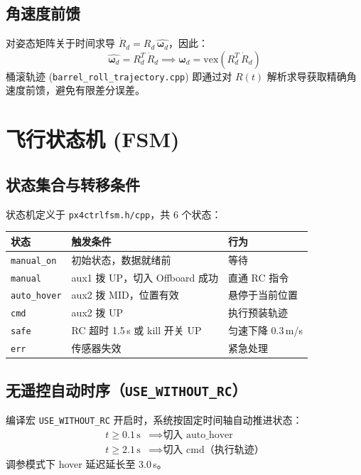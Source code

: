 \documentclass[UTF8, a4paper, 11pt]{ctexart}
\newcommand{\bw}{\boldsymbol{\omega}}
\newcommand{\hhat}[1]{\widehat{#1}}
\begin{document}
\subsection{角速度前馈}

对姿态矩阵关于时间求导 $\dot{R}_d = R_d\,\hhat{\bw_d}$，因此：
\begin{equation}
  \hhat{\bw_d} = R_d^T\,\dot{R}_d \implies \bw_d = \mathrm{vex}\!\left(R_d^T\,\dot{R}_d\right)
\end{equation}
桶滚轨迹 (\texttt{barrel\_roll\_trajectory.cpp}) 即通过对 $R(t)$ 解析求导获取精确角速度前馈，避免有限差分误差。

\section{飞行状态机 (FSM)}

\subsection{状态集合与转移条件}

状态机定义于 \texttt{px4ctrlfsm.h/cpp}，共 6 个状态：

\begin{center}
\begin{tabular}{lll}
\toprule
状态 & 触发条件 & 行为 \\
\midrule
\texttt{manual\_on} & 初始状态，数据就绪前 & 等待 \\
\texttt{manual}     & aux1 拨 UP，切入 Offboard 成功 & 直通 RC 指令 \\
\texttt{auto\_hover}& aux2 拨 MID，位置有效 & 悬停于当前位置 \\
\texttt{cmd}        & aux2 拨 UP & 执行预装轨迹 \\
\texttt{safe}       & RC 超时 1.5\,s 或 kill 开关 UP & 匀速下降 0.3\,m/s \\
\texttt{err}        & 传感器失效 & 紧急处理 \\
\bottomrule
\end{tabular}
\end{center}

\subsection{无遥控自动时序（\texttt{USE\_WITHOUT\_RC}）}

编译宏 \texttt{USE\_WITHOUT\_RC} 开启时，系统按固定时间轴自动推进状态：
\begin{align*}
  t \geq 0.1\,\text{s} &\implies \text{切入 auto\_hover}\\
  t \geq 2.1\,\text{s} &\implies \text{切入 cmd（执行轨迹）}
\end{align*}
调参模式下 hover 延迟延长至 3.0\,s。
\end{document}
